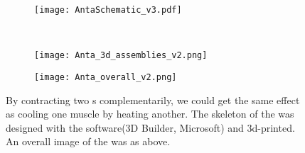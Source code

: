 \begin{figure}[t]
	\centering
	\begin{subfigure}[t]{0.5\textwidth}
		\centering\texttt{[image: AntaSchematic\_v3.pdf]}
		\caption{\label{anta_sch}}
	\end{subfigure}
	~			
	\begin{subfigure}[t]{0.3\textwidth}
		\centering\texttt{[image: Anta\_3d\_assemblies\_v2.png]}
		\caption{\label{3d_assemblies}}
	\end{subfigure}
	
	\begin{subfigure}[t]{0.81\textwidth}
		\centering\texttt{[image: Anta\_overall\_v2.png]}
		\caption{\label{anta_overall}}
	\end{subfigure}
	
	\caption[An \Anta]{ By contracting two \scpnospace s complementarily, we could get the same effect as cooling one muscle by heating another.  The skeleton of the \anta was designed with the software(3D Builder, Microsoft) and 3d-printed.  An overall image of the \anta was as above.}
	\label{anta_design}
\end{figure}
